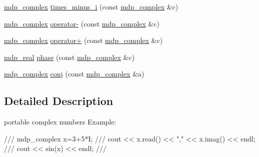 \begin{DoxyCompactItemize}
\item 
\hyperlink{classmdp__complex}{mdp\_\-complex} \hyperlink{classmdp__complex_a0ccefb1f54f375c0f2e23c6f26ecdbbe}{times\_\-minus\_\-i} (const \hyperlink{classmdp__complex}{mdp\_\-complex} \&c)
\item 
\hyperlink{classmdp__complex}{mdp\_\-complex} \hyperlink{classmdp__complex_a9dbd08dfce91bbc62f7e1b2926a63dcd}{operator-\/} (const \hyperlink{classmdp__complex}{mdp\_\-complex} \&c)
\item 
\hyperlink{classmdp__complex}{mdp\_\-complex} \hyperlink{classmdp__complex_addd8f88607b984dd6642d8f6785d2d5c}{operator+} (const \hyperlink{classmdp__complex}{mdp\_\-complex} \&c)
\item 
\hyperlink{mdp__global__vars_8h_a049e4c1d4e74d644878a42f9909463e4}{mdp\_\-real} \hyperlink{classmdp__complex_a54c5a00e1f1f36c105a4587431fd2dab}{phase} (const \hyperlink{classmdp__complex}{mdp\_\-complex} \&c)
\item 
\hyperlink{classmdp__complex}{mdp\_\-complex} \hyperlink{classmdp__complex_a87d03a17271a85f700b7fa512c3e7db7}{conj} (const \hyperlink{classmdp__complex}{mdp\_\-complex} \&a)
\end{DoxyCompactItemize}


\subsection{Detailed Description}
portable complex numbers Example: \begin{DoxyVerb}
///    mdp_complex x=3+5*I;
///    cout << x.read() << "," << x.imag() << endl;
///    cout << sin(x) << endl;
/// \end{DoxyVerb}
 


